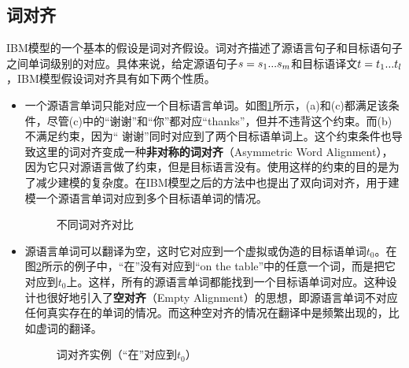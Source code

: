 \subsection{词对齐}

\parinterval IBM模型的一个基本的假设是词对齐假设。词对齐描述了源语言句子和目标语句子之间单词级别的对应。具体来说，给定源语句子${s}=s_1...s_m$和目标语译文${t}=t_1...t_l$，IBM模型假设词对齐具有如下两个性质。

\begin{itemize}
\vspace{0.5em}
\item 一个源语言单词只能对应一个目标语言单词。如图\ref{fig:5-15}所示，(a)和(c)都满足该条件，尽管(c)中的“谢谢”和“你”都对应“thanks”，但并不违背这个约束。而(b)不满足约束，因为“ 谢谢”同时对应到了两个目标语单词上。这个约束条件也导致这里的词对齐变成一种{\small\sffamily\bfseries{非对称的词对齐}}（Asymmetric Word Alignment），因为它只对源语言做了约束，但是目标语言没有。使用这样的约束的目的是为了减少建模的复杂度。在IBM模型之后的方法中也提出了双向词对齐，用于建模一个源语言单词对应到多个目标语单词的情况。

\begin{figure}[htp]
    \centering

\setlength{\belowcaptionskip}{-0.5em}
    \caption{不同词对齐对比}
    \label{fig:5-15}
\end{figure}

\item 源语言单词可以翻译为空，这时它对应到一个虚拟或伪造的目标语单词$t_0$。在图\ref{fig:5-16}所示的例子中，“在”没有对应到“on the table”中的任意一个词，而是把它对应到$t_0$上。这样，所有的源语言单词都能找到一个目标语单词对应。这种设计也很好地引入了{\small\sffamily\bfseries{空对齐}}（Empty Alignment）的思想，即源语言单词不对应任何真实存在的单词的情况。而这种空对齐的情况在翻译中是频繁出现的，比如虚词的翻译。

\begin{figure}[htp]
    \centering

\setlength{\belowcaptionskip}{-0.5em}
    \caption{词对齐实例（“在”对应到$t_0$）}
    \label{fig:5-16}
\end{figure}
\end{itemize}


